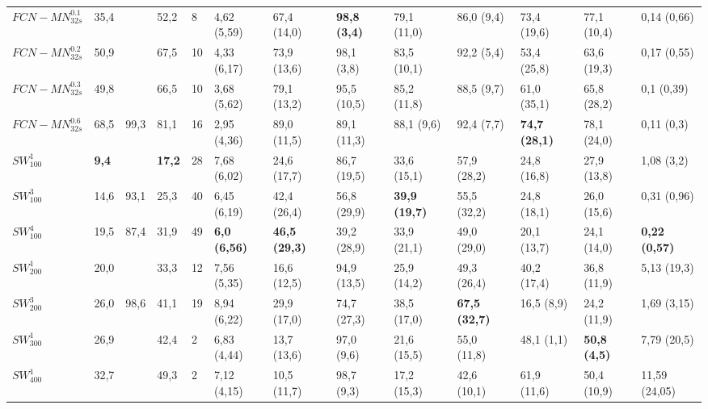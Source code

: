 \documentclass[a4paper,authoryear,review]{elsarticle}
\begin{document}
\begin{table}[]
\begin{adjustbox}{angle=90}
{\begin{tabular}{lllllllllllll}
			$FCN-MN_{32s}^{0.1}$ & 35,4 & \cellcolor[HTML]{81D41A}{\ul \textbf{100}} & 52,2 & 8 & 4,62 (5,59) & 67,4 (14,0) & \cellcolor[HTML]{81D41A}\textbf{98,8 (3,4)} & 79,1 (11,0) & 86,0 (9,4) & 73,4 (19,6) & 77,1 (10,4) & 0,14 (0,66) \\
			$FCN-MN_{32s}^{0.2}$ & 50,9 & \cellcolor[HTML]{81D41A}{\ul \textbf{100}} & 67,5 & 10 & 4,33 (6,17) & 73,9 (13,6) & 98,1 (3,8) & 83,5 (10,1) & 92,2 (5,4) & 53,4 (25,8) & 63,6 (19,3) & 0,17 (0,55) \\
			$FCN-MN_{32s}^{0.3}$ & 49,8 & \cellcolor[HTML]{81D41A}{\ul \textbf{100}} & 66,5 & 10 & 3,68 (5,62) & 79,1 (13,2) & 95,5 (10,5) & 85,2 (11,8) & 88,5 (9,7) & 61,0 (35,1) & 65,8 (28,2) & 0,1 (0,39) \\
			$FCN-MN_{32s}^{0.6}$ & 68,5 & 99,3 & 81,1 & 16 & 2,95 (4,36) & 89,0 (11,5) & 89,1 (11,3) & 88,1 (9,6) & 92,4 (7,7) & \cellcolor[HTML]{81D41A}\textbf{74,7 (28,1)} & 78,1 (24,0) & 0,11 (0,3) \\
			$SW_{100}^{1}$ & \textbf{9,4} & \cellcolor[HTML]{E0C2CD}{\ul \textbf{100}} & \textbf{17,2} & 28 & 7,68 (6,02) & 24,6 (17,7) & 86,7 (19,5) & 33,6 (15,1) & 57,9 (28,2) & 24,8 (16,8) & 27,9 (13,8) & 1,08 (3,2) \\
			$SW_{100}^{3}$ & 14,6 & 93,1 & 25,3 & 40 & 6,45 (6,19) & 42,4 (26,4) & 56,8 (29,9) & \cellcolor[HTML]{E0C2CD}\textbf{39,9 (19,7)} & 55,5 (32,2) & 24,8 (18,1) & 26,0 (15,6) & 0,31 (0,96) \\
			$SW_{100}^{4}$ & 19,5 & 87,4 & 31,9 & 49 & \cellcolor[HTML]{E0C2CD}\textbf{6,0 (6,56)} & \cellcolor[HTML]{E0C2CD}\textbf{46,5 (29,3)} & 39,2 (28,9) & 33,9 (21,1) & 49,0 (29,0) & 20,1 (13,7) & 24,1 (14,0) & \cellcolor[HTML]{E0C2CD}\textbf{0,22 (0,57)} \\
			$SW_{200}^{1}$ & 20,0 & \cellcolor[HTML]{E0C2CD}{\ul \textbf{100}} & 33,3 & 12 & 7,56 (5,35) & 16,6 (12,5) & 94,9 (13,5) & 25,9 (14,2) & 49,3 (26,4) & 40,2 (17,4) & 36,8 (11,9) & 5,13 (19,3) \\
			$SW_{200}^{3}$ & 26,0 & 98,6 & 41,1 & 19 & 8,94 (6,22) & 29,9 (17,0) & 74,7 (27,3) & 38,5 (17,0) & \cellcolor[HTML]{E0C2CD}\textbf{67,5 (32,7)} & 16,5 (8,9) & 24,2 (11,9) & 1,69 (3,15) \\
			$SW_{300}^{1}$ & 26,9 & \cellcolor[HTML]{E0C2CD}{\ul \textbf{100}} & 42,4 & 2 & 6,83 (4,44) & 13,7 (13,6) & 97,0 (9,6) & 21,6 (15,5) & 55,0 (11,8) & 48,1 (1,1) & \cellcolor[HTML]{E0C2CD}\textbf{50,8 (4,5)} & 7,79 (20,5) \\
			$SW_{400}^{1}$ & 32,7 & \cellcolor[HTML]{E0C2CD}{\ul \textbf{100}} & 49,3 & 2 & 7,12 (4,15) & 10,5 (11,7) & 98,7 (9,3) & 17,2 (15,3) & 42,6 (10,1) & 61,9 (11,6) & 50,4 (10,9) & 11,59 (24,05) \\

\end{tabular}}
\end{adjustbox}
\end{table}
\end{document}
